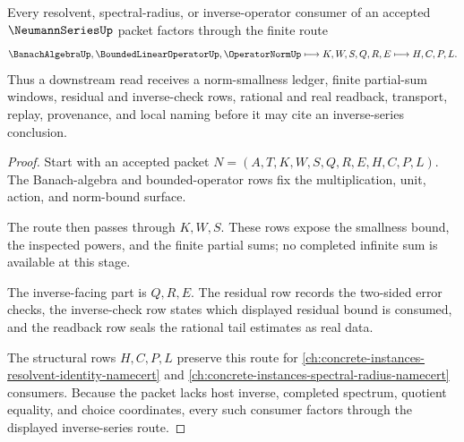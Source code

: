 \begin{theorem}
\label{thm:neumann-series-inverse-route}
Every resolvent, spectral-radius, or inverse-operator consumer of an accepted $\NeumannSeriesUp$ packet factors through the finite route
$$
\BanachAlgebraUp,\BoundedLinearOperatorUp,\OperatorNormUp
\longmapsto
K,W,S,Q,R,E
\longmapsto
H,C,P,L .
$$
Thus a downstream read receives a norm-smallness ledger, finite partial-sum windows, residual and inverse-check rows, rational and real readback, transport, replay, provenance, and local naming before it may cite an inverse-series conclusion.
\end{theorem}
\begin{proof}
Start with an accepted packet $N=(A,T,K,W,S,Q,R,E,H,C,P,L)$. The Banach-algebra and bounded-operator rows fix the multiplication, unit, action, and norm-bound surface.

The route then passes through $K,W,S$. These rows expose the smallness bound, the inspected powers, and the finite partial sums; no completed infinite sum is available at this stage.

The inverse-facing part is $Q,R,E$. The residual row records the two-sided error checks, the inverse-check row states which displayed residual bound is consumed, and the readback row seals the rational tail estimates as real data.

The structural rows $H,C,P,L$ preserve this route for \autoref{ch:concrete-instances-resolvent-identity-namecert} and \autoref{ch:concrete-instances-spectral-radius-namecert} consumers. Because the packet lacks host inverse, completed spectrum, quotient equality, and choice coordinates, every such consumer factors through the displayed inverse-series route.
\end{proof}



